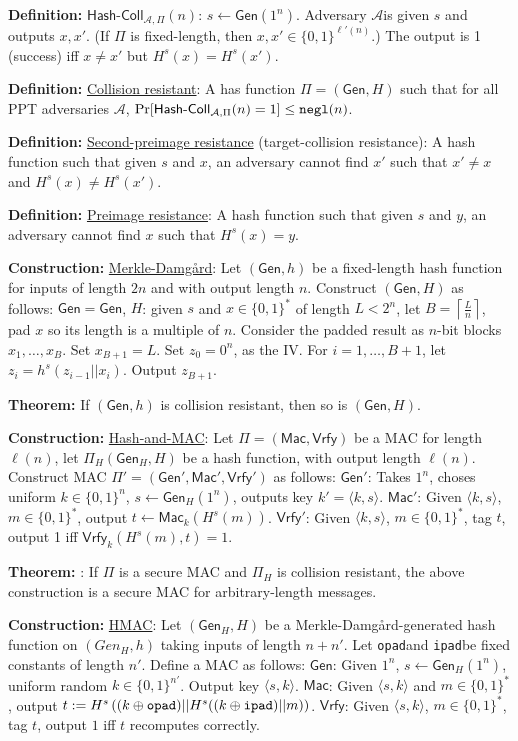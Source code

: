 \documentclass[12pt]{article}
\newcommand{\AAA}{\mathcal{A}}
\newcommand{\defn}[1]{{\bf Definition:} \underline{#1}}
\newcommand{\thm}[1]{{\bf Theorem:} \underline{#1}}
\newcommand{\con}[1]{{\bf Construction:} \underline{#1}}
\newcommand{\Mac}{\mathsf{Mac}}
\newcommand{\Vrfy}{\mathsf{Vrfy}}
\newcommand{\Gen}{\mathsf{Gen}}
\newcommand{\ang}[1]{\langle#1\rangle}
\newcommand{\ExptHCArgs}[2]{\mathsf{Hash\text{-}Coll}_{#1,#2}}
\newcommand{\ExptHC}{\ExptHCArgs{\AAA}{\Pi}}
\newcommand{\xor}{\oplus}
\newcommand{\negl}{{\tt negl}}
\newcommand{\opad}{{\tt opad}}
\newcommand{\ipad}{{\tt ipad}}
\newcommand{\from}{\leftarrow}
\begin{document}
\begin{multicols}{2}
\defn{$\ExptHC(n)$}: $s\from\Gen(1^n)$. Adversary $\AAA$is given $s$ and outputs $x,x'$. (If $\Pi$ is fixed-length, then $x,x'\in\{0,1\}^{\ell'(n)}$.) The output is 1 (success) iff $x\neq x'$ but $H^s(x)=H^s(x')$.

\defn{Collision resistant}: A has function $\Pi=(\Gen, H)$ such that for all PPT adversaries $\AAA$, $\Pr[\ExptHC(n)=1]\leq\negl(n)$.

\defn{Second-preimage resistance} (target-collision resistance): A hash function such that given $s$ and $x$, an adversary cannot find $x'$ such that $x'\neq x$ and $H^s(x)\neq H^s(x')$.

\defn{Preimage resistance}: A hash function such that given $s$ and $y$, an adversary cannot find $x$ such that $H^s(x)=y$.

\con{Merkle-Damg\r{a}rd}: Let $(\Gen, h)$ be a fixed-length hash function for inputs of length $2n$ and with output length $n$. Construct $(\Gen, H)$ as follows: $\Gen=\Gen$, $H$: given $s$ and $x\in\{0,1\}^*$ of length $L<2^n$, let $B=\left\lceil\frac{L}{n}\right\rceil$, pad $x$ so its length is a multiple of $n$. Consider the padded result as $n$-bit blocks $x_1, \dots,x_B$. Set $x_{B+1}=L$. Set $z_0=0^n$, as the IV. For $i=1,\dots,B+1$, let $z_i=h^s(z_{i-1}||x_i)$. Output $z_{B+1}$.

\thm{} If $(\Gen, h)$ is collision resistant, then so is $(\Gen, H)$.

\con{Hash-and-MAC}: Let $\Pi=(\Mac,\Vrfy)$ be a MAC for length $\ell(n)$, let $\Pi_{H}(\Gen_H,H)$ be a hash function, with output length $\ell(n)$. Construct MAC $\Pi'=(\Gen',\Mac',\Vrfy')$ as follows: $\Gen'$: Takes $1^n$, choses uniform $k\in\{0,1\}^n$, $s\from\Gen_H(1^n)$, outputs key $k'=\ang{k,s}$. $\Mac'$: Given $\ang{k,s}$, $m\in\{0,1\}^*$, output $t\from\Mac_k(H^s(m))$. $\Vrfy'$: Given $\ang{k,s}$, $m\in\{0,1\}^*$, tag $t$, output 1 iff $\Vrfy_k(H^s(m),t)=1$.

\thm{}: If $\Pi$ is a secure MAC and $\Pi_H$ is collision resistant, the above construction is a secure MAC for arbitrary-length messages.

\con{HMAC}: Let $(\Gen_H,H)$ be a Merkle-Damg\r{a}rd-generated hash function on $(Gen_H,h)$ taking inputs of length $n+n'$. Let \opad and \ipad be fixed constants of length $n'$. Define a MAC as follows: $\Gen$: Given $1^n$, $s\from\Gen_H(1^n)$, uniform random $k\in\{0,1\}^{n'}$. Output key $\ang{s,k}$. $\Mac$: Given $\ang{s,k}$ and $m\in\{0,1\}^*$, output $t:=H^s\left((k\xor\opad)||H^s((k\xor\ipad)||m)\right)$. $\Vrfy$: Given $\ang{s,k}$, $m\in\{0,1\}^*$, tag $t$, output $1$ iff $t$ recomputes correctly.


\end{multicols}
\end{document}

